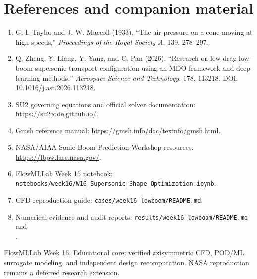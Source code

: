 \newpage
\section*{References and companion material}
\begin{enumerate}
\item G. I. Taylor and J. W. Maccoll (1933), ``The air pressure on a cone moving at high speeds,'' \emph{Proceedings of the Royal Society A}, 139, 278--297.
\item Q. Zheng, Y. Liang, Y. Yang, and C. Pan (2026), ``Research on low-drag low-boom supersonic transport configuration using an MDO framework and deep learning methods,'' \emph{Aerospace Science and Technology}, 178, 113218. DOI: \href{https://doi.org/10.1016/j.ast.2026.113218}{10.1016/j.ast.2026.113218}.
\item SU2 governing equations and official solver documentation: \url{https://su2code.github.io/}.
\item Gmsh reference manual: \url{https://gmsh.info/doc/texinfo/gmsh.html}.
\item NASA/AIAA Sonic Boom Prediction Workshop resources: \url{https://lbpw.larc.nasa.gov/}.
\item FlowMLLab Week 16 notebook: \texttt{notebooks/week16/W16\_Supersonic\_Shape\_Optimization.ipynb}.
\item CFD reproduction guide: \texttt{cases/week16\_lowboom/README.md}.
\item Numerical evidence and audit reports: \texttt{results/week16\_lowboom/README.md} and\\ .
\end{enumerate}

\vfill
\begin{center}\small
FlowMLLab Week 16. Educational core: verified axisymmetric CFD, POD/ML surrogate modeling, and independent design recomputation. NASA reproduction remains a deferred research extension.
\end{center}

